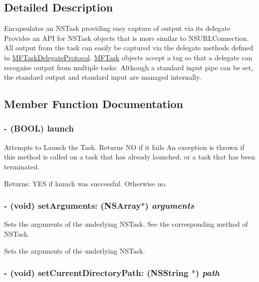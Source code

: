 \subsection{Detailed Description}
Encapsulates an NSTask providing easy capture of output via its delegate Provides an API for NSTask objects that is more similar to NSURLConnection. All output from the task can easily be captured via the delegate methods defined in \hyperlink{protocol_m_f_task_delegate_protocol-p}{MFTaskDelegateProtocol}. \hyperlink{interface_m_f_task}{MFTask} objects accept a tag so that a delegate can recognise output from multiple tasks. Although a standard input pipe can be set, the standard output and standard input are managed internally. 

\subsection{Member Function Documentation}
\hypertarget{interface_m_f_task_3d205da2f4b5c916d55ca5aca2c7f80a}{
\subsubsection[{launch}]{\setlength{\rightskip}{0pt plus 5cm}- (BOOL) launch }}
\label{interface_m_f_task_3d205da2f4b5c916d55ca5aca2c7f80a}


Attempts to Launch the Task. Returns NO if it fails An exception is thrown if this method is called on a task that has already launched, or a task that has been terminated. 

\begin{Desc}
\item[Returns:]YES if launch was successful. Otherwise no. \end{Desc}
\hypertarget{interface_m_f_task_7f3a645cb573f47e28aab31fefea1eea}{
\subsubsection[{setArguments:}]{\setlength{\rightskip}{0pt plus 5cm}- (void) setArguments: (NSArray$\ast$) {\em arguments}}}
\label{interface_m_f_task_7f3a645cb573f47e28aab31fefea1eea}


Sets the arguments of the underlying NSTask. See the corresponding method of NSTask. 

Sets the arguments of the underlying NSTask. \hypertarget{interface_m_f_task_44899b422530ddfd76073d9608df6672}{
\subsubsection[{setCurrentDirectoryPath:}]{\setlength{\rightskip}{0pt plus 5cm}- (void) setCurrentDirectoryPath: (NSString $\ast$) {\em path}}}
\label{interface_m_f_task_44899b422530ddfd76073d9608df6672}


